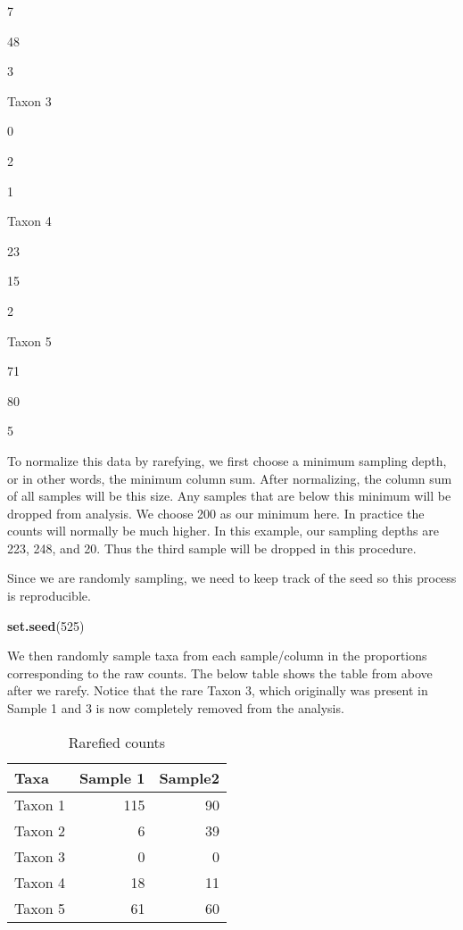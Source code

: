 \documentclass[
]{book}
\newenvironment{Shaded}{\begin{snugshade}}{\end{snugshade}}
\newcommand{\DecValTok}[1]{\textcolor[rgb]{0.00,0.00,0.81}{#1}}
\newcommand{\KeywordTok}[1]{\textcolor[rgb]{0.13,0.29,0.53}{\textbf{#1}}}
\newcommand{\NormalTok}[1]{#1}
\begin{document}
7

48

3

Taxon 3

0

2

1

Taxon 4

23

15

2

Taxon 5

71

80

5

To normalize this data by rarefying, we first choose a minimum sampling depth, or in other words, the minimum column sum. After normalizing, the column sum of all samples will be this size. Any samples that are below this minimum will be dropped from analysis. We choose 200 as our minimum here. In practice the counts will normally be much higher. In this example, our sampling depths are 223, 248, and 20. Thus the third sample will be dropped in this procedure.

Since we are randomly sampling, we need to keep track of the seed so this process is reproducible.

\begin{Shaded}
\begin{Highlighting}[]
\KeywordTok{set.seed}\NormalTok{(}\DecValTok{525}\NormalTok{)}
\end{Highlighting}
\end{Shaded}

We then randomly sample taxa from each sample/column in the proportions corresponding to the raw counts. The below table shows the table from above after we rarefy. Notice that the rare Taxon 3, which originally was present in Sample 1 and 3 is now completely removed from the analysis.

\begin{table}

\caption{\label{tab:unnamed-chunk-17}Rarefied counts}
\centering
\begin{tabular}[t]{l|r|r}
\hline
Taxa & Sample 1 & Sample2\\
\hline
Taxon 1 & 115 & 90\\
\hline
Taxon 2 & 6 & 39\\
\hline
Taxon 3 & 0 & 0\\
\hline
Taxon 4 & 18 & 11\\
\hline
Taxon 5 & 61 & 60\\
\hline
\end{tabular}
\end{table}
\end{document}
